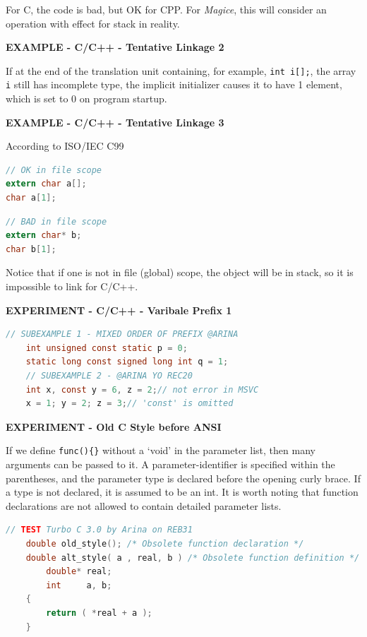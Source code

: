 For C, the code is bad, but OK for CPP. For \textit{Magice}, this will consider an operation with effect for stack in reality.

\textbf{EXAMPLE - C/C++ - Tentative Linkage 2}

If at the end of the translation unit containing, for example, \verb|int i[];|, the array \verb|i| still has incomplete type, the implicit initializer causes it to have 1 element, which is set to 0 on program startup.

\textbf{EXAMPLE - C/C++ - Tentative Linkage 3}

According to ISO/IEC C99

\lstset{style=GlobalC}
\begin{lstlisting}[language=C]
// OK in file scope
extern char a[];
char a[1];
\end{lstlisting}

\begin{lstlisting}[language=C]
// BAD in file scope
extern char* b;
char b[1];
\end{lstlisting}

Notice that if one is not in file (global) scope, the object will be in stack, so it is impossible to link for C/C++.

\textbf{EXPERIMENT - C/C++ - Varibale Prefix 1}

\begin{lstlisting}[language=C]
	// SUBEXAMPLE 1 - MIXED ORDER OF PREFIX @ARINA
	int unsigned const static p = 0;
	static long const signed long int q = 1;
	// SUBEXAMPLE 2 - @ARINA YO REC20
	int x, const y = 6, z = 2;// not error in MSVC
	x = 1; y = 2; z = 3;// 'const' is omitted
\end{lstlisting}

\textbf{EXPERIMENT - Old C Style before ANSI}

If we define \verb|func(){}| without a `void' in the parameter list, then many arguments can be passed to it. A parameter-identifier is specified within the parentheses, and the parameter type is declared before the opening curly brace. If a type is not declared, it is assumed to be an int. It is worth noting that function declarations are not allowed to contain detailed parameter lists.

\begin{lstlisting}[language=C]
	// TEST Turbo C 3.0 by Arina on REB31
	double old_style(); /* Obsolete function declaration */
	double alt_style( a , real, b ) /* Obsolete function definition */
		double* real;
		int     a, b;
	{
		return ( *real + a );
	}
\end{lstlisting}



